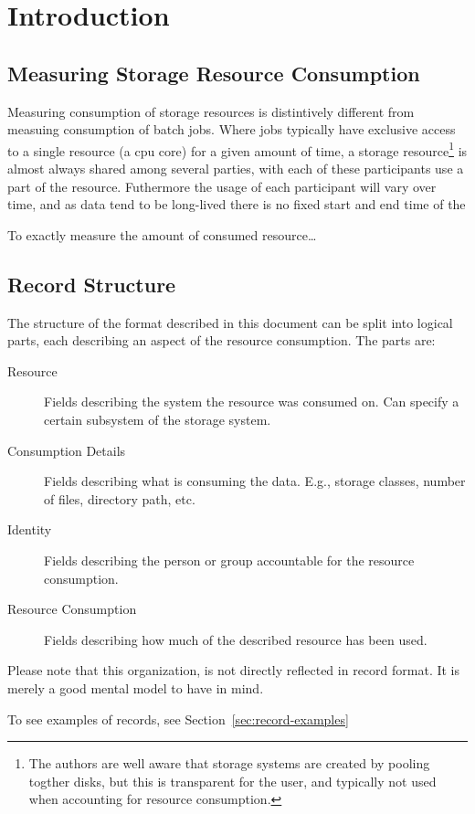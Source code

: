 \section{Introduction}


\subsection{Measuring Storage Resource Consumption}

Measuring consumption of storage resources is distintively different from
measuing consumption of batch jobs. Where jobs typically have exclusive access
to a single resource (a cpu core) for a given amount of time, a storage
resource\footnote{The authors are well aware that storage systems are created
by pooling togther disks, but this is transparent for the user, and typically
not used when accounting for resource consumption.} is almost always shared
among several parties, with each of these participants use a part of the
resource. Futhermore the usage of each participant will vary over time, and as
data tend to be long-lived there is no fixed start and end time of the 

To exactly measure the amount of consumed resource\ldots



\subsection{Record Structure}

The structure of the format described in this document can be split into
logical parts, each describing an aspect of the resource consumption. The parts
are:

\begin{description}

\item[Resource] Fields describing the system the resource was consumed on. Can
specify a certain subsystem of the storage system.

\item[Consumption Details] Fields describing what is consuming the data. E.g.,
storage classes, number of files, directory path, etc.

\item[Identity] Fields describing the person or group accountable for the
resource consumption.

\item[Resource Consumption] Fields describing how much of the described
resource has been used.

\end{description}

Please note that this organization, is not directly reflected in record format.
It is merely a good mental model to have in mind.

To see examples of records, see Section~\ref{sec:record-examples}

